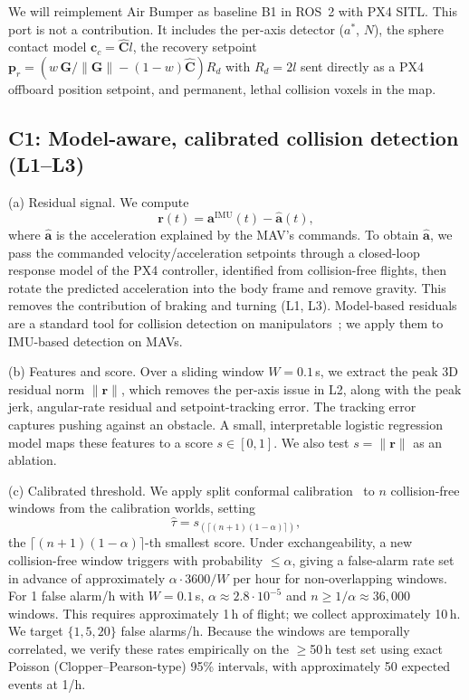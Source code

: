 \documentclass[conference,10pt]{IEEEtran}
\begin{document}
We will reimplement Air Bumper as baseline B1 in ROS~2 with PX4 SITL. This port is not a contribution. It includes the per-axis detector ($a^*$, $N$), the sphere contact model $\mathbf{c}_c=\hat{\mathbf{C}}l$, the recovery setpoint $\mathbf{p}_r=(w\,\mathbf{G}/\|\mathbf{G}\|-(1-w)\hat{\mathbf{C}})R_d$ with $R_d=2l$ sent directly as a PX4 offboard position setpoint, and permanent, lethal collision voxels in the map.

\subsection{C1: Model-aware, calibrated collision detection (L1--L3)}
(a) Residual signal. We compute
\begin{equation}
\mathbf{r}(t)=\mathbf{a}^{\text{IMU}}(t)-\hat{\mathbf{a}}(t),
\end{equation}
where $\hat{\mathbf{a}}$ is the acceleration explained by the MAV's commands. To obtain $\hat{\mathbf{a}}$, we pass the commanded velocity/acceleration setpoints through a closed-loop response model of the PX4 controller, identified from collision-free flights, then rotate the predicted acceleration into the body frame and remove gravity. This removes the contribution of braking and turning (L1, L3). Model-based residuals are a standard tool for collision detection on manipulators~\cite{haddadin}; we apply them to IMU-based detection on MAVs.

(b) Features and score. Over a sliding window $W=0.1$\,s, we extract the peak 3D residual norm $\|\mathbf{r}\|$, which removes the per-axis issue in L2, along with the peak jerk, angular-rate residual and setpoint-tracking error. The tracking error captures pushing against an obstacle. A small, interpretable logistic regression model maps these features to a score $s\in[0,1]$. We also test $s=\|\mathbf{r}\|$ as an ablation.

(c) Calibrated threshold. We apply split conformal calibration~\cite{vovk,angelopoulos} to $n$ collision-free windows from the calibration worlds, setting
\begin{equation}
\hat\tau = s_{(\lceil (n+1)(1-\alpha)\rceil)},
\end{equation}
the $\lceil (n+1)(1-\alpha)\rceil$-th smallest score. Under exchangeability, a new collision-free window triggers with probability $\le\alpha$, giving a false-alarm rate set in advance of approximately $\alpha\cdot3600/W$ per hour for non-overlapping windows. For 1 false alarm/h with $W=0.1$\,s, $\alpha\approx2.8\cdot10^{-5}$ and $n\ge1/\alpha\approx36{,}000$ windows. This requires approximately 1\,h of flight; we collect approximately 10\,h. We target $\{1,5,20\}$ false alarms/h. Because the windows are temporally correlated, we verify these rates empirically on the $\ge$50\,h test set using exact Poisson (Clopper--Pearson-type) 95\% intervals, with approximately 50 expected events at 1/h.
\end{document}
